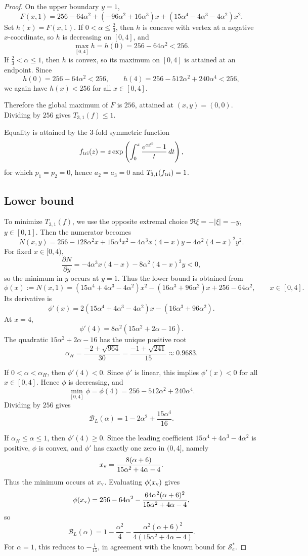 \documentclass[11pt,reqno]{amsart}
\numberwithin{equation}{section}
\begin{document}
\begin{proof}
On the upper boundary $y=1$,
\[
F(x,1)
=
256-64\alpha^2
+(-96\alpha^2+16\alpha^3)x
+(15\alpha^4-4\alpha^3-4\alpha^2)x^2.
\]
Set $h(x)=F(x,1)$. If $0<\alpha\le\frac23$, then $h$ is concave with vertex at a negative $x$-coordinate, so $h$ is decreasing on $[0,4]$, and
\[
\max_{[0,4]}h=h(0)=256-64\alpha^2<256.
\]
If $\frac23<\alpha\le1$, then $h$ is convex, so its maximum on $[0,4]$ is attained at an endpoint. Since
\[
h(0)=256-64\alpha^2<256,
\qquad
h(4)=256-512\alpha^2+240\alpha^4<256,
\]
we again have $h(x)<256$ for all $x\in[0,4]$.

Therefore the global maximum of $F$ is $256$, attained at $(x,y)=(0,0)$. Dividing by $256$ gives $T_{3,1}(f)\le1$.

Equality is attained by the $3$-fold symmetric function
\[
f_{\rm tri}(z)
=
z\exp\left(\int_0^z\frac{e^{\alpha t^3}-1}{t}\,dt\right),
\]
for which $p_1=p_2=0$, hence $a_2=a_3=0$ and $T_{3,1}(f_{\rm tri})=1$.

\subsection*{Lower bound}
To minimize $T_{3,1}(f)$, we use the opposite extremal choice $\Re\xi=-|\xi|=-y$, $y\in[0,1]$. Then the numerator becomes
\[
N(x,y)
=
256-128\alpha^2 x+15\alpha^4 x^2
-4\alpha^3 x(4-x)y
-4\alpha^2(4-x)^2 y^2.
\]
For fixed $x\in[0,4)$,
\[
\frac{\partial N}{\partial y}
=
-4\alpha^3 x(4-x)-8\alpha^2(4-x)^2 y<0,
\]
so the minimum in $y$ occurs at $y=1$. Thus the lower bound is obtained from
\begin{equation}\label{ND35}
\phi(x):=N(x,1)
=
(15\alpha^4+4\alpha^3-4\alpha^2)x^2
-(16\alpha^3+96\alpha^2)x
+256-64\alpha^2,
\qquad x\in[0,4].
\end{equation}
Its derivative is
\[
\phi'(x)
=
2(15\alpha^4+4\alpha^3-4\alpha^2)x
-(16\alpha^3+96\alpha^2).
\]
At $x=4$,
\[
\phi'(4)=8\alpha^2(15\alpha^2+2\alpha-16).
\]
The quadratic $15\alpha^2+2\alpha-16$ has the unique positive root
\[
\alpha_H
=
\frac{-2+\sqrt{964}}{30}
=
\frac{-1+\sqrt{241}}{15}
\approx0.9683.
\]

If $0<\alpha<\alpha_H$, then $\phi'(4)<0$. Since $\phi'$ is linear, this implies $\phi'(x)<0$ for all $x\in[0,4]$. Hence $\phi$ is decreasing, and
\[
\min_{[0,4]}\phi=\phi(4)
=
256-512\alpha^2+240\alpha^4.
\]
Dividing by $256$ gives
\[
\mathcal{B}_L(\alpha)
=
1-2\alpha^2+\frac{15\alpha^4}{16}.
\]

If $\alpha_H\le\alpha\le1$, then $\phi'(4)\ge0$. Since the leading coefficient $15\alpha^4+4\alpha^3-4\alpha^2$ is positive, $\phi$ is convex, and $\phi'$ has exactly one zero in $(0,4]$, namely
\[
x_{\rm v}
=
\frac{8(\alpha+6)}{15\alpha^2+4\alpha-4}.
\]
Thus the minimum occurs at $x_{\rm v}$. Evaluating $\phi(x_{\rm v})$ gives
\[
\phi(x_{\rm v})
=
256-64\alpha^2-\frac{64\alpha^2(\alpha+6)^2}{15\alpha^2+4\alpha-4},
\]
so
\[
\mathcal{B}_L(\alpha)
=
1-\frac{\alpha^2}{4}
-\frac{\alpha^2(\alpha+6)^2}{4(15\alpha^2+4\alpha-4)}.
\]
For $\alpha=1$, this reduces to $-\frac1{15}$, in agreement with the known bound for $\mathcal{S}_e^*$.


\end{proof}
\end{document}
